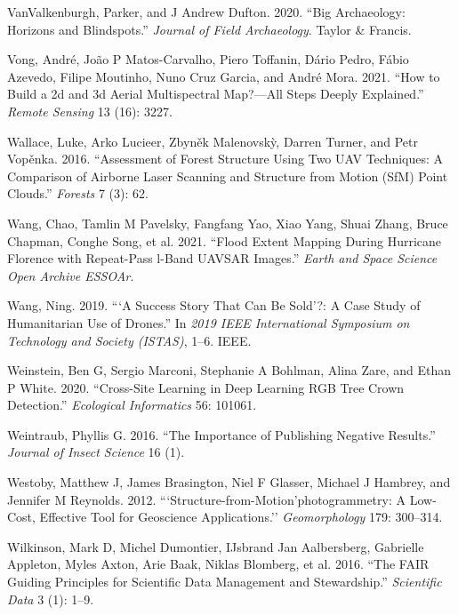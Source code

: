 \documentclass[
  12pt,
]{article}
\newlength{\cslhangindent}
\newlength{\cslentryspacingunit} %
\newenvironment{CSLReferences}[2] %
 {%
  \setlength{\parindent}{0pt}
  \ifodd #1
  \let\oldpar\par
  \def\par{\hangindent=\cslhangindent\oldpar}
  \fi
  \setlength{\parskip}{#2\cslentryspacingunit}
 }%
 {}
\begin{document}
\begin{CSLReferences}{1}{0}
\leavevmode{}%
VanValkenburgh, Parker, and J Andrew Dufton. 2020. {``Big Archaeology:
Horizons and Blindspots.''} \emph{Journal of Field Archaeology}. Taylor
\& Francis.

\leavevmode{}%
Vong, André, João P Matos-Carvalho, Piero Toffanin, Dário Pedro, Fábio
Azevedo, Filipe Moutinho, Nuno Cruz Garcia, and André Mora. 2021. {``How
to Build a 2d and 3d Aerial Multispectral Map?---All Steps Deeply
Explained.''} \emph{Remote Sensing} 13 (16): 3227.

\leavevmode{}%
Wallace, Luke, Arko Lucieer, Zbyněk Malenovskỳ, Darren Turner, and Petr
Vopěnka. 2016. {``Assessment of Forest Structure Using Two UAV
Techniques: A Comparison of Airborne Laser Scanning and Structure from
Motion (SfM) Point Clouds.''} \emph{Forests} 7 (3): 62.

\leavevmode{}%
Wang, Chao, Tamlin M Pavelsky, Fangfang Yao, Xiao Yang, Shuai Zhang,
Bruce Chapman, Conghe Song, et al. 2021. {``Flood Extent Mapping During
Hurricane Florence with Repeat-Pass l-Band UAVSAR Images.''} \emph{Earth
and Space Science Open Archive ESSOAr}.

\leavevmode{}%
Wang, Ning. 2019. {``{`A Success Story That Can Be Sold'}?: A Case Study
of Humanitarian Use of Drones.''} In \emph{2019 IEEE International
Symposium on Technology and Society (ISTAS)}, 1--6. IEEE.

\leavevmode{}%
Weinstein, Ben G, Sergio Marconi, Stephanie A Bohlman, Alina Zare, and
Ethan P White. 2020. {``Cross-Site Learning in Deep Learning RGB Tree
Crown Detection.''} \emph{Ecological Informatics} 56: 101061.

\leavevmode{}%
Weintraub, Phyllis G. 2016. {``The Importance of Publishing Negative
Results.''} \emph{Journal of Insect Science} 16 (1).

\leavevmode{}%
Westoby, Matthew J, James Brasington, Niel F Glasser, Michael J Hambrey,
and Jennifer M Reynolds. 2012. {```Structure-from-Motion'photogrammetry:
A Low-Cost, Effective Tool for Geoscience Applications.''}
\emph{Geomorphology} 179: 300--314.

\leavevmode{}%
Wilkinson, Mark D, Michel Dumontier, IJsbrand Jan Aalbersberg, Gabrielle
Appleton, Myles Axton, Arie Baak, Niklas Blomberg, et al. 2016. {``The
FAIR Guiding Principles for Scientific Data Management and
Stewardship.''} \emph{Scientific Data} 3 (1): 1--9.


\end{CSLReferences}
\end{document}
